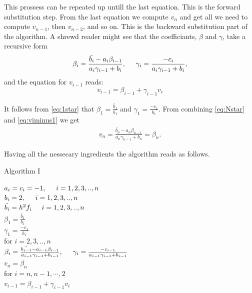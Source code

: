 \documentclass[11pt,a4paper,english]{article}
\numberwithin{equation}{section}
\begin{document}
This prossess can be repeated up untill the last equation. 
This is the forward substitution step. 
From the last equation we compute $v_n$ and get all we need to compute $v_{n-1}$,
then $v_{n-2}$, and so on. This is the backward substitution part of the algorithm. A shrewd reader might see that the coefficiants, $\beta$ and $\gamma$, take a recursive form
\begin{align*}
\beta_{i} = \frac{\tilde{b_i}-a_i \beta_{i-1}}{a_i \gamma_{i-1} + b_i} , \hspace{0.5cm} \gamma_{i}=\frac{-c_i}{a_i \gamma_{i-1} + b_i},
\end{align*}
and the equation for $v_{i-1}$ reads: 
\begin{equation}
v_{i-1} = \beta_{i-1} + \gamma_{i-1} v_i
\label{eq:viminus1}
\end{equation}

It follows from \eqref{eq:1star} that $\beta_1 = \frac{\tilde{b_1}}{b_1}$ and $\gamma_1 = \frac{-c_1}{b_1}$.
From combining \eqref{eq:Nstar} and \eqref{eq:viminus1} we get 
\begin{align*}
v_n = \frac{\tilde{b_n}-a_n \beta_{n-1}}{a_n \gamma_{n-1} + b_n} = \beta_{n}.
\end{align*}

Having all the nessecary ingredients the algorithm reads as follows.
\vspace{0.5cm}

\centerline{Algorithm I}
\begin{tcolorbox}
$a_i = c_i = -1, \hspace{0.5cm}  i=1,2,3,..,n$\\
$b_i = 2, \hspace{0.5cm}  i=1,2,3,..,n $\\
$\tilde{b_i} = h^2 f_i \hspace{0.5cm}  i=1,2,3,..,n $\\
$\beta_1 = \frac{\tilde{b_1}}{b_1}$ \\
$\gamma_1 = \frac{-c_1}{b_1}$ \\
for $i=2,3,..,n$ \\ \vspace{0.5cm} 
 \hspace{0.5cm} $ \beta_{i} = \frac{\tilde{b_{i-1}}-a_{i-1} \beta_{i-1}}{a_{i-1} \gamma_{i-1} + b_{i-1}} , \hspace{0.5cm} \gamma_{i}=\frac{-c_{i-1}}{a_{i-1} \gamma_{i-1} + b_{i-1}} $ \vspace{0.2cm}  \\
 $v_{n} = \beta_{n}$\\
for $i=n, n-1, \cdots ,2$\\ \vspace{0.5cm} 
 \hspace{0.5cm} $v_{i-1} = \beta_{i-1} + \gamma_{i-1} v_i$
\end{tcolorbox} 
\end{document}
